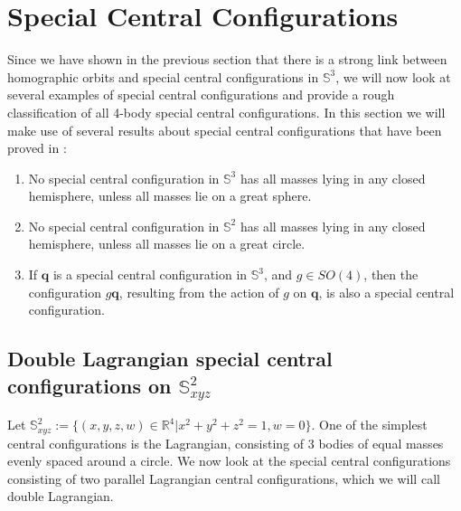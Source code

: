 \documentclass[12pt]{amsart}
\theoremstyle{definition}
\def \mb{\mathbb}
\def \R{\mb R}                 %
\def \S{\mb S}        %
\newcommand {\q} {\mathbf{q}}
\begin{document}
{%
\section{Special Central Configurations}

Since we have shown in the previous section that there is a strong link between homographic orbits and special central configurations in $\S^3$, we will now look at several examples of special central configurations and provide a rough classification of all 4-body special central configurations. In this section we will make use of several results about special central configurations that have been proved in \cite{DiacuZhu}:
\begin{enumerate}
\item No special central configuration in $\S^3$ has all masses lying in any closed hemisphere, unless all masses lie on a great sphere.
\item No special central configuration in $\S^2$ has all masses lying in any closed hemisphere, unless all masses lie on a great circle.
\item If $\q$ is a special central configuration in $\S^3$, and $g \in SO(4)$, then the configuration $g\q$, resulting from the action of $g$ on $\q$, is also a special central configuration.
\end{enumerate}
\smallskip


\subsection{Double Lagrangian special central configurations on $\S^2_{xyz}$}
Let $\S^2_{xyz}:=\{(x,y,z,w)\in \R^4| x^2+y^2+z^2=1, w=0\}.$   One of the simplest central configurations is the Lagrangian, consisting of 3 bodies of equal masses evenly spaced around a circle\cite{Diacu3, DiacuZhu}. We now look at the special central configurations consisting of two parallel Lagrangian central configurations, which we will call double Lagrangian.


}
\end{document}
